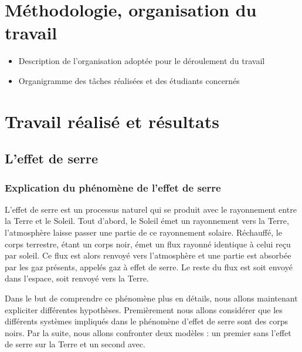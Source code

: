 \documentclass[a4paper, 12pt]{report} %
\begin{document}

\chapter{Méthodologie, organisation du travail}

\begin{itemize}
\item Description de l'organisation adoptée pour le déroulement du travail
\item Organigramme des tâches réalisées et des étudiants concernés
\end{itemize}


\chapter{Travail réalisé et résultats}

\section{L'effet de serre}

\subsection{Explication du phénomène de l'effet de serre}

	L'effet de serre est un processus naturel qui se produit 
avec le rayonnement entre la Terre et le Soleil. Tout d'abord, 
le Soleil émet un rayonnement vers la Terre, l'atmosphère 
laisse passer une partie de ce rayonnement solaire. Réchauffé, 
le corps terrestre, étant un corps noir, émet un flux rayonné 
identique à celui reçu par soleil. Ce flux est alors renvoyé 
vers l'atmosphère et une partie est absorbée par les gaz 
présents, appelés gaz à effet de serre. Le reste du flux 
est soit envoyé dans l'espace, soit renvoyé vers la Terre.
\vspace{\baselineskip}

Dans le but de comprendre ce phénomène plus en détails, nous allons maintenant expliciter 
différentes hypothèses. Premièrement nous allons considérer que les différents systèmes impliqués 
dans le phénomène d’effet de serre sont des corps noirs. Par la suite, nous allons confronter 
deux modèles : un premier sans l'effet de serre sur la Terre et un second avec.
\vspace{\baselineskip}
\end{document}
